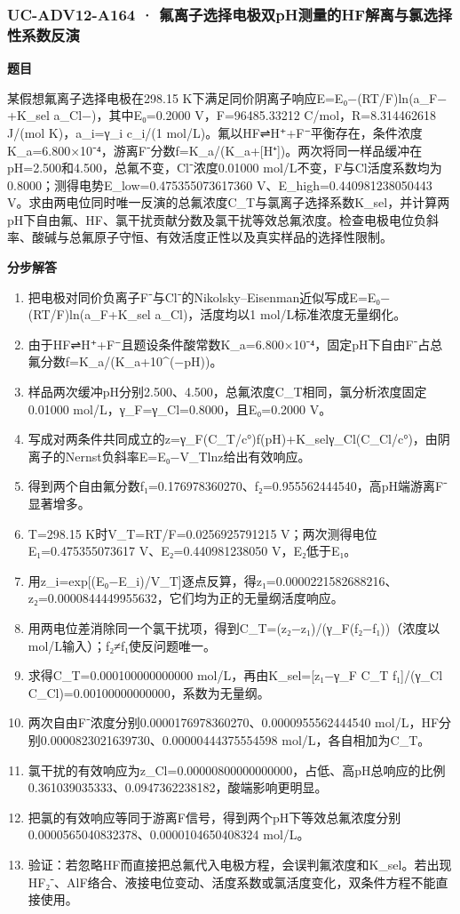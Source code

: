 \documentclass[UTF8,11pt,a4paper]{ctexart}
\begin{document}
\subsubsection*{UC-ADV12-A164 · 氟离子选择电极双pH测量的HF解离与氯选择性系数反演}
\noindent\textbf{题目}\par
某假想氟离子选择电极在298.15 K下满足同价阴离子响应E=E₀−(RT/F)ln(a\_F−+K\_sel a\_Cl−)，其中E₀=0.2000 V，F=96485.33212 C/mol，R=8.314462618 J/(mol K)，a\_i=γ\_i c\_i/(1 mol/L)。氟以HF⇌H⁺+F⁻平衡存在，条件浓度K\_a=6.800×10⁻⁴，游离F⁻分数f=K\_a/(K\_a+[H⁺])。两次将同一样品缓冲在pH=2.500和4.500，总氟不变，Cl⁻浓度0.01000 mol/L不变，F与Cl活度系数均为0.8000；测得电势E\_low=0.475355073617360 V、E\_high=0.440981238050443 V。求由两电位同时唯一反演的总氟浓度C\_T与氯离子选择系数K\_sel，并计算两pH下自由氟、HF、氯干扰贡献分数及氯干扰等效总氟浓度。检查电极电位负斜率、酸碱与总氟原子守恒、有效活度正性以及真实样品的选择性限制。\par
\medskip\noindent\textbf{分步解答}
\begin{enumerate}
\item 把电极对同价负离子F⁻与Cl⁻的Nikolsky–Eisenman近似写成E=E₀−(RT/F)ln(a\_F+K\_sel a\_Cl)，活度均以1 mol/L标准浓度无量纲化。
\item 由于HF⇌H⁺+F⁻且题设条件酸常数K\_a=6.800×10⁻⁴，固定pH下自由F⁻占总氟分数f=K\_a/(K\_a+10\textasciicircum{}(−pH))。
\item 样品两次缓冲pH分别2.500、4.500，总氟浓度C\_T相同，氯分析浓度固定0.01000 mol/L，γ\_F=γ\_Cl=0.8000，且E₀=0.2000 V。
\item 写成对两条件共同成立的z=γ\_F(C\_T/c°)f(pH)+K\_selγ\_Cl(C\_Cl/c°)，由阴离子的Nernst负斜率E=E₀−V\_Tlnz给出有效响应。
\item 得到两个自由氟分数f₁=0.176978360270、f₂=0.955562444540，高pH端游离F⁻显著增多。
\item T=298.15 K时V\_T=RT/F=0.0256925791215 V；两次测得电位E₁=0.475355073617 V、E₂=0.440981238050 V，E₂低于E₁。
\item 用z\_i=exp[(E₀−E\_i)/V\_T]逐点反算，得z₁=0.0000221582688216、z₂=0.0000844449955632，它们均为正的无量纲活度响应。
\item 用两电位差消除同一个氯干扰项，得到C\_T=(z₂−z₁)/(γ\_F(f₂−f₁))（浓度以mol/L输入）；f₂≠f₁使反问题唯一。
\item 求得C\_T=0.000100000000000 mol/L，再由K\_sel=[z₁−γ\_F C\_T f₁]/(γ\_Cl C\_Cl)=0.00100000000000，系数为无量纲。
\item 两次自由F⁻浓度分别0.0000176978360270、0.0000955562444540 mol/L，HF分别0.0000823021639730、0.00000444375554598 mol/L，各自相加为C\_T。
\item 氯干扰的有效响应为z\_Cl=0.00000800000000000，占低、高pH总响应的比例0.361039035333、0.0947362238182，酸端影响更明显。
\item 把氯的有效响应等同于游离F信号，得到两个pH下等效总氟浓度分别0.0000565040832378、0.0000104650408324 mol/L。
\item 验证：若忽略HF而直接把总氟代入电极方程，会误判氟浓度和K\_sel。若出现HF₂⁻、AlF络合、液接电位变动、活度系数或氯活度变化，双条件方程不能直接使用。
\end{enumerate}
\end{document}
